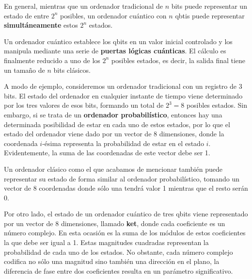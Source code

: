 \documentclass[nochap]{apuntesURJC}
\begin{document}
En general, mientras que un ordenador tradicional de $n$ bits puede representar un estado de entre $2^n$ posibles, un ordenador cuántico con $n$ qbtis puede representar \textbf{simultáneamente} estos $2^n$ estados.

Un ordenador cuántico establece los qbits en un valor inicial controlado y los manipula mediante una serie de \textbf{puertas lógicas cuánticas}. El cálculo es finalmente reducido a uno de los $2^n$ posibles estados, es decir, la salida final tiene un tamaño de $n$ bits clásicos.

A modo de ejemplo, consideremos un ordenador tradicional con un registro de 3 bits. El estado del ordenador en cualquier instante de tiempo viene determinado por los tres valores de esos bits, formando un total de $2^3=8$ posibles estados. Sin embargo, si se trata de un \textbf{ordenador probabilístico}, entonces hay una determinada posibilidad de estar en cada uno de estos estados, por lo que el estado del ordenador viene dado por un vector de 8 dimensiones, donde la coordenada $i$-ésima representa la probabilidad de estar en el estado $i$. Evidentemente, la suma de las coordenadas de este vector debe ser 1.

Un ordenador clásico como el que acabamos de mencionar también puede representar su estado de forma similar al ordenador probabilístico, tomando un vector de 8 coordenadas donde sólo una tendrá valor 1 mientras que el resto serán 0.

Por otro lado, el estado de un ordenador cuántico de tres qbits viene representado por un vector de 8 dimensiones, llamado \textbf{ket}, donde cada coeficiente es un número complejo. En esta ocasión es la suma de los módulos de estos coeficientes la que debe ser igual a 1. Estas magnitudes cuadradas representan la probabilidad de cada uno de los estados. No obstante, cada número complejo codifica no sólo una magnitud sino también una dirección en el plano, la diferencia de fase entre dos coeficientes resulta en un parámetro significativo.


%


\end{document}
